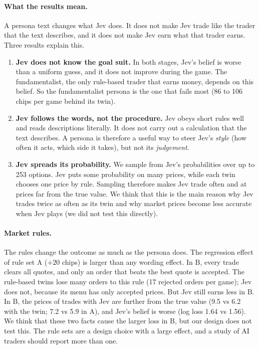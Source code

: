 \paragraph{What the results mean.} A persona text changes what Jev does. It does not make Jev trade like the trader
that the text describes, and it does not make Jev earn what that trader earns. Three results explain this.
\begin{enumerate}
\item \textbf{Jev does not know the goal suit.} In both stages, Jev's belief is worse than a uniform guess, and it does
not improve during the game. The fundamentalist, the only rule-based trader that earns money, depends on this belief.
So the fundamentalist persona is the one that fails most (86 to 106 chips per game behind its twin).
\item \textbf{Jev follows the words, not the procedure.} Jev obeys short rules well and reads descriptions literally.
It does not carry out a calculation that the text describes. A persona is therefore a useful way to steer Jev's
\emph{style} (how often it acts, which side it takes), but not its \emph{judgement}.
\item \textbf{Jev spreads its probability.} We sample from Jev's probabilities over up to 253 options. Jev puts some
probability on many prices, while each twin chooses one price by rule. Sampling therefore makes Jev trade often and at
prices far from the true value. We think that this is the main reason why Jev trades twice as often as its twin and why market prices
become less accurate when Jev plays (we did not test this directly).
\end{enumerate}

\paragraph{Market rules.} The rules change the outcome as much as the persona does. The regression effect of rule set A
($+20$ chips) is larger than any wording effect. In B, every trade clears all quotes, and only an order that beats the
best quote is accepted. The rule-based twins lose many orders to this rule (17 rejected orders per game); Jev does not,
because its menu has only accepted prices. But Jev still earns less in B. In B, the prices of trades with Jev are further from the true value
(9.5 vs 6.2 with the twin; 7.2 vs 5.9 in A), and Jev's belief is worse (log loss 1.64 vs 1.56). We think that these
two facts cause the larger loss in B, but our design does not test this. The rule sets are a design choice with a large effect, and a study of AI
traders should report more than one.


